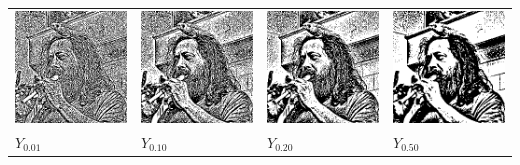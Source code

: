 \begin{tabular}{llll}
	\includegraphics{weiro-i01.png} &
	\includegraphics{weiro-i10.png} &
	\includegraphics{weiro-i20.png} &
	\includegraphics{weiro-i50.png} \\
	$Y_{0.01}$ &
	$Y_{0.10}$ &
	$Y_{0.20}$ &
	$Y_{0.50}$
\end{tabular}

